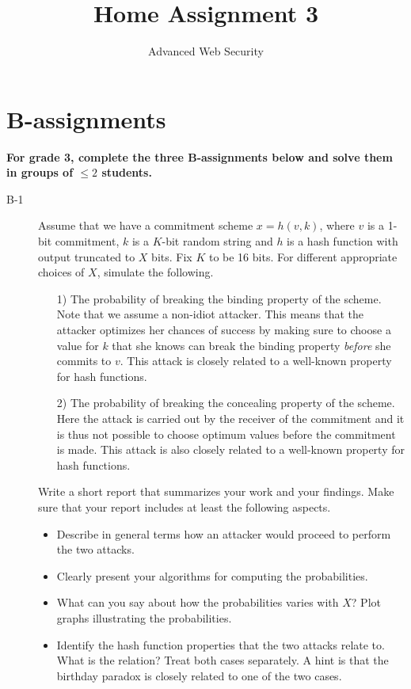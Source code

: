 \documentclass{article}
\begin{document}
	
\title{Home Assignment 3}
\author{Advanced Web Security}
\date{\the\year}

\maketitle

\section*{B-assignments}
\textbf{For grade 3, complete the three B-assignments below and solve them in groups of $\leq 2$ students.}

\begin{description}
	\item[B-1]{Assume that we have a commitment scheme $x = h(v, k)$, where $v$ is a 1-bit commitment,
		$k$ is a $K$-bit random string and $h$ is a hash function with output truncated to $X$ bits.
		Fix $K$ to be 16 bits. For different appropriate choices of $X$, simulate the following.
		\begin{itemize}
			\item[1)] The probability of breaking the binding property of the scheme. Note that we assume a non-idiot attacker. This means that the attacker optimizes her chances of success by making sure to choose a value for $k$ that she knows can break the binding property \textit{before} she commits to $v$. This attack is closely related to a well-known property for hash functions.
			\item[2)] The probability of breaking the concealing property of the scheme. Here the attack is carried out by the receiver of the commitment and it is thus not possible to choose optimum values before the commitment is made. This attack is also closely related to a well-known property for hash functions.
		\end{itemize}
		Write a short report that summarizes your work and your findings. Make sure that your report includes at least the following aspects.
		\begin{itemize}
			\item Describe in general terms how an attacker would proceed to perform the two attacks.
			\item Clearly present your algorithms for computing the probabilities.
			\item What can you say about how the probabilities varies with $X$? Plot graphs illustrating the probabilities. 
			\item Identify the hash function properties that the two attacks relate to. What is the relation? Treat both cases separately. A hint is that the birthday paradox is closely related to one of the two cases.

\end{itemize}}
\end{description}
\end{document}
